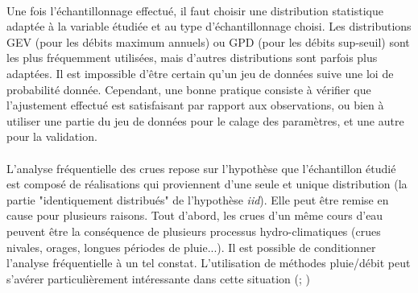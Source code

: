 \documentclass[11pt]{article}
\begin{document}
	\paragraph{} Une fois l'échantillonnage effectué, il faut choisir une distribution statistique adaptée à la variable étudiée et au type d'échantillonnage choisi. Les distributions GEV (pour les débits maximum annuels) ou GPD (pour les débits sup-seuil) sont les plus fréquemment utilisées, mais d'autres distributions sont parfois plus adaptées. Il est impossible d'être certain qu'un jeu de données suive une loi de probabilité donnée. Cependant, une bonne pratique consiste à vérifier que l'ajustement effectué est satisfaisant par rapport aux observations, ou bien à utiliser une partie du jeu de données pour le calage des paramètres, et une autre pour la validation. 
	
	\paragraph{} L'analyse fréquentielle des crues repose sur l'hypothèse que l'échantillon étudié est composé de réalisations qui proviennent d'une seule et unique distribution (la partie "identiquement distribués" de l'hypothèse \textit{iid}). Elle peut être remise en cause pour plusieurs raisons. Tout d'abord, les crues d'un même cours d'eau peuvent être la conséquence de plusieurs processus hydro-climatiques (crues nivales, orages, longues périodes de pluie...). Il est possible de conditionner l'analyse fréquentielle à un tel constat. L'utilisation de méthodes pluie/débit peut s'avérer particulièrement intéressante dans cette situation (\citep{paquet_schadex_2013}; \citet{brigode_changement_2013})
	
\end{document}
